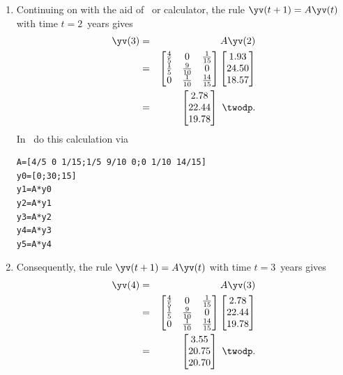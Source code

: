 \begin{example}[orangutans]
\begin{solution}
\begin{enumerate}
\item Continuing on with the aid of \script\ or calculator, the rule \(\yv(t+1)=A\yv(t)\) with time \(t=2\)~years gives
\begin{eqnarray*}
\yv(3)&=&A\yv(2)
\\&=&\begin{bmatrix} \frac45&0&\frac1{15}
\\\frac15&\frac9{10}&0
\\0&\frac1{10}&\frac{14}{15} \end{bmatrix}
\begin{bmatrix} 1.93\\24.50\\18.57 \end{bmatrix}
\\&=&\begin{bmatrix} 2.78\\22.44\\19.78 \end{bmatrix}\ \twodp.
\end{eqnarray*}
In \script\ do this calculation via
\begin{verbatim}
A=[4/5 0 1/15;1/5 9/10 0;0 1/10 14/15]
y0=[0;30;15]
y1=A*y0
y2=A*y1
y3=A*y2
y4=A*y3
y5=A*y4
\end{verbatim}
\setbox\ajrqrbox\hbox{}%
\marginpar{\usebox{\ajrqrbox}}%

\item Consequently, the rule \(\yv(t+1)=A\yv(t)\) with time \(t=3\)~years gives
\begin{eqnarray*}
\yv(4)&=&A\yv(3)
\\&=&\begin{bmatrix} \frac45&0&\frac1{15}
\\\frac15&\frac9{10}&0
\\0&\frac1{10}&\frac{14}{15} \end{bmatrix}
\begin{bmatrix} 2.78\\22.44\\19.78 \end{bmatrix}
\\&=&\begin{bmatrix} 3.55\\20.75\\20.70 \end{bmatrix}\ \twodp.
\end{eqnarray*}
  

\end{enumerate}
\end{solution}
\end{example}
